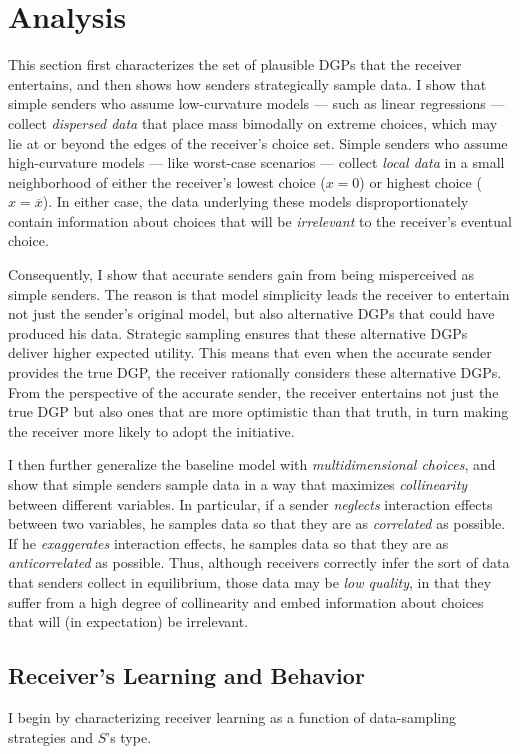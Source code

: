 \documentclass[11pt,dvipsnames]{article}
\begin{document}
\section{Analysis}\label{section:learning}
This section first characterizes the set of plausible DGPs that the receiver entertains, and then shows how senders strategically sample data.
I show that simple senders who assume low-curvature models --- such as linear regressions --- collect \emph{dispersed data} that place mass bimodally on extreme choices, which may lie at or beyond the edges of the receiver's choice set.
Simple senders who assume high-curvature models --- like worst-case scenarios --- collect \emph{local data} in a small neighborhood of either the receiver's lowest choice ($x=0$) or highest choice ($x=\overline{x}$).
In either case, the data underlying these models disproportionately contain information about choices that will be \emph{irrelevant} to the receiver's eventual choice.

Consequently, I show that accurate senders gain from being misperceived as simple senders.
The reason is that model simplicity leads the receiver to entertain not just the sender's original model, but also alternative DGPs that could have produced his data.
Strategic sampling ensures that these alternative DGPs deliver higher expected utility.
This means that even when the accurate sender provides the true DGP, the receiver rationally considers these alternative DGPs.
From the perspective of the accurate sender, the receiver entertains not just the true DGP but also ones that are more optimistic than that truth, in turn making the receiver more likely to adopt the initiative.

I then further generalize the baseline model with \emph{multidimensional choices}, and show that simple senders sample data in a way that maximizes \emph{collinearity} between different variables.
In particular, if a sender \emph{neglects} interaction effects between two variables, he samples data so that they are as \emph{correlated} as possible.
If he \emph{exaggerates} interaction effects, he samples data so that they are as \emph{anticorrelated} as possible.
Thus, although receivers correctly infer the sort of data that senders collect in equilibrium, those data may be \emph{low quality}, in that they suffer from a high degree of collinearity and embed information about choices that will (in expectation) be irrelevant.

\subsection{Receiver's Learning and Behavior}
I begin by characterizing receiver learning as a function of data-sampling strategies and $S$'s type.
\end{document}
